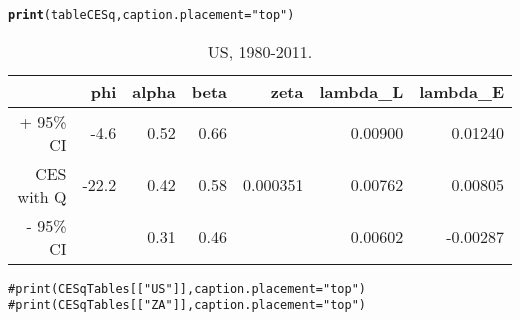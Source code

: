\documentclass[preprint,authoryear,12pt]{elsarticle}\usepackage{graphicx, color}
\makeatletter
\newcommand{\hlfunctioncall}[1]{\textcolor[rgb]{0.501960784313725,0,0.329411764705882}{\textbf{#1}}}%
\newcommand{\hlstring}[1]{\textcolor[rgb]{0.6,0.6,1}{#1}}%
\newcommand{\hlcomment}[1]{\textcolor[rgb]{0.180392156862745,0.6,0.341176470588235}{#1}}%
\newenvironment{kframe}{%
 \def\at@end@of@kframe{}%
 \ifinner\ifhmode%
  \def\at@end@of@kframe{\end{minipage}}%
  \begin{minipage}{\columnwidth}%
 \fi\fi%
 \def\FrameCommand##1{\hskip\@totalleftmargin \hskip-\fboxsep
 \colorbox{shadecolor}{##1}\hskip-\fboxsep
     \hskip-\linewidth \hskip-\@totalleftmargin \hskip\columnwidth}%
 \MakeFramed {\advance\hsize-\width
   \@totalleftmargin\z@ \linewidth\hsize
   \@setminipage}}%
 {\par\unskip\endMakeFramed%
 \at@end@of@kframe}
\makeatother
\begin{document}
\begin{kframe}
\begin{alltt}
\hlfunctioncall{print}(tableCESq, caption.placement=\hlstring{"top"})
\end{alltt}
\end{kframe}%
\begin{table}[ht]
\begin{center}
\caption{US, 1980-2011.}
\begin{tabular}{rrrrrrr}
  \hline
 & phi & alpha & beta & zeta & lambda\_L & lambda\_E \\ 
  \hline
+ 95\% CI & -4.6 & 0.52 & 0.66 &  & 0.00900 & 0.01240 \\ 
  CES with Q & -22.2 & 0.42 & 0.58 & 0.000351 & 0.00762 & 0.00805 \\ 
  - 95\% CI &  & 0.31 & 0.46 &  & 0.00602 & -0.00287 \\ 
   \hline
\end{tabular}
\end{center}
\end{table}
\begin{kframe}\begin{alltt}

\hlcomment{#print(CESqTables[["US"]], caption.placement="top")}
\hlcomment{#print(CESqTables[["ZA"]], caption.placement="top")}
\end{alltt}
\end{kframe}



\end{document}
